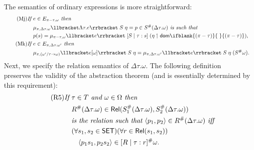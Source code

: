\documentclass[sigplan,screen,nonacm,balance=false]{acmart}
\theoremstyle{plain}
\DeclarePairedDelimiter{\pair}{\langle}{\rangle}
\DeclarePairedDelimiter{\interp}{\llbracket}{\rrbracket}
\newcommand{\dom}[1]{\mathsf{dom}\ifblank{#1}{\;}{#1}}
\newcommand{\Rel}{\mathsf{Rel}}
\newcommand{\SET}{\mathsf{SET}}
\begin{document}
The semantics of ordinary expressions is more straightforward:
%
\begin{align*}
  \tag{Mj}
  \textit{If } & e \in E_{\pi - \tau, \omega} \textit{ then } \\
  & \mu_{\pi, \Delta \tau. \omega} \interp{\Lambda \tau. e} \; S \; \eta = p \in S^\#(\Delta \tau. \omega) \textit{ is such that } \\
  & p(s) = \mu_{\pi - \tau, \omega} \interp{e} \; [S \mid \tau: s] \; (\eta \upharpoonleft \dom{(\pi - \tau)}), \\
  \tag{Mk}
  \textit{If } & e \in E_{\pi, \Delta \tau. \omega'} \textit{ then } \\
  & \mu_{\pi, (\omega'/\tau \to \omega)} \interp{e[\omega]} \; S \; \eta = \mu_{\pi, \Delta \tau. \omega'} \interp{e} \; S \; \eta \; (S^\# \omega).
\end{align*}
%
Next, we specify the relation semantics of $\Delta \tau. \omega$.
The following definition preserves the validity of the abstraction theorem (and is essentially determined by this requirement):
%
\begin{align*}\tag{R5}\label{R5}
  \textit{If } & \tau \in T \textit{ and } \omega \in \Omega \textit{ then } \\
  & R^\#(\Delta \tau. \omega) \in \Rel(S^\#_1(\Delta \tau. \omega), S^\#_2(\Delta \tau. \omega)) \\
  & \textit{is the relation such that } \pair{p_1, p_2} \in R^\#(\Delta \tau. \omega) \textit{ iff } \\
  & (\forall s_1, s_2 \in \SET) (\forall r \in \Rel(s_1, s_2)) \\
  & \quad \pair{p_1 s_1, p_2 s_2} \in [R \mid \tau: r]^\# \omega.
\end{align*}
\end{document}
